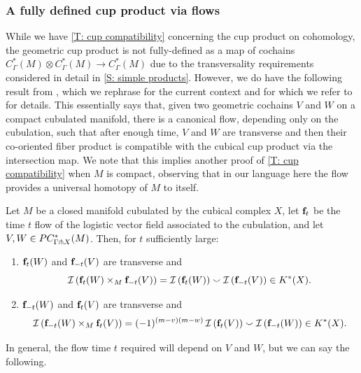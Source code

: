 \subsubsection{A fully defined cup product via flows}\label{S: flows}
While we have \cref{T: cup compatibility} concerning the cup product on cohomology, the geometric cup product is not fully-defined as a map of cochains $C^*_\Gamma(M) \otimes C^*_\Gamma(M) \to C^*_\Gamma(M)$ due to the transversality requirements considered in detail in \cref{S: simple products}.
However, we do have the following result from \cite{FMS-flows}, which we rephrase for the current context and for which we refer to \cite{FMS-flows} for details.
This essentially says that, given two geometric cochains $V$ and $W$ on a compact cubulated manifold, there is a canonical flow, depending only on the cubulation, such that after enough time, $V$ and $W$ are transverse and then their co-oriented fiber product is compatible with the cubical cup product via the intersection map.
We note that this implies another proof of \cref{T: cup compatibility} when $M$ is compact, observing that in our language here the flow provides a universal homotopy of $M$ to itself.

\begin{theorem}\label{T: FMMS}
	Let $M$ be a closed manifold cubulated by the cubical complex $X$, let $\mathbf{f}_t$ be the time $t$ flow of the logistic vector field associated to the cubulation, and let $V,W \in PC^*_{\Gamma \pitchfork X}(M)$.
	Then, for $t$ sufficiently large:
	\begin{enumerate}
		\item $\mathbf{f}_t(W)$ and $\mathbf{f}_{-t}(V)$ are transverse and
		\[
		\mathcal{I} \left(\mathbf{f}_t(W) \times_M \mathbf{f}_{-t}(V)\right) = \mathcal{I} \left(\mathbf{f}_t(W)\right) \smallsmile \mathcal{I} \left(\mathbf{f}_{-t}(V)\right) \in K^*(X).
		\]
		\item $\mathbf{f}_{-t}(W)$ and $\mathbf{f}_t(V)$ are transverse and
		\[
		\mathcal{I} \left(\mathbf{f}_{-t}(W) \times_M \mathbf{f}_t(V)\right) = (-1)^{(m-v)(m-w)} \, \mathcal{I} \left(\mathbf{f}_t(V)\right) \smallsmile \mathcal{I} \left(\mathbf{f}_{-t}(W)\right) \in K^*(X).
		\]
	\end{enumerate}
\end{theorem}



In general, the flow time $t$ required will depend on $V$ and $W$, but we can say the following.

